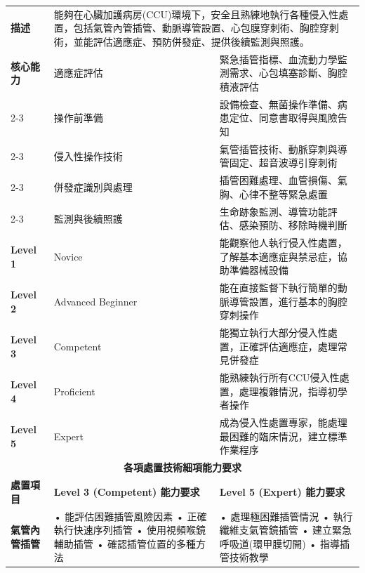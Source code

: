 \documentclass[12pt,a4paper]{article}
\begin{document}
\begin{longtable}{|p{1.5cm}|p{4cm}|p{8.5cm}|}
\rowcolor{emergency_red!10}
\multicolumn{3}{|c|}{\textbf{EPA 11: CCU侵入性處置操作與管理}} \\
\hline
\textbf{描述} & \multicolumn{2}{|p{12.5cm}|}{能夠在心臟加護病房(CCU)環境下，安全且熟練地執行各種侵入性處置，包括氣管內管插管、動脈導管設置、心包膜穿刺術、胸腔穿刺術，並能評估適應症、預防併發症、提供後續監測與照護。} \\
\hline
\textbf{核心能力} & 適應症評估 & 緊急插管指標、血流動力學監測需求、心包填塞診斷、胸腔積液評估 \\
\cline{2-3}
& 操作前準備 & 設備檢查、無菌操作準備、病患定位、同意書取得與風險告知 \\
\cline{2-3}
& 侵入性操作技術 & 氣管插管技術、動脈穿刺與導管固定、超音波導引穿刺術 \\
\cline{2-3}
& 併發症識別與處理 & 插管困難處理、血管損傷、氣胸、心律不整等緊急處置 \\
\cline{2-3}
& 監測與後續照護 & 生命跡象監測、導管功能評估、感染預防、移除時機判斷 \\
\hline
\textbf{Level 1} & Novice & 能觀察他人執行侵入性處置，了解基本適應症與禁忌症，協助準備器械設備 \\
\hline
\textbf{Level 2} & Advanced Beginner & 能在直接監督下執行簡單的動脈導管設置，進行基本的胸腔穿刺操作 \\
\hline
\textbf{Level 3} & Competent & 能獨立執行大部分侵入性處置，正確評估適應症，處理常見併發症 \\
\hline
\textbf{Level 4} & Proficient & 能熟練執行所有CCU侵入性處置，處理複雜情況，指導初學者操作 \\
\hline
\textbf{Level 5} & Expert & 成為侵入性處置專家，能處理最困難的臨床情況，建立標準作業程序 \\
\hline

\multicolumn{3}{|c|}{\textbf{各項處置技術細項能力要求}} \\
\hline
\rowcolor{emergency_blue!10}
\textbf{處置項目} & \textbf{Level 3 (Competent) 能力要求} & \textbf{Level 5 (Expert) 能力要求} \\
\hline

\textbf{氣管內管插管} & • 能評估困難插管風險因素 \newline • 正確執行快速序列插管 \newline • 使用視頻喉鏡輔助插管 \newline • 確認插管位置的多種方法 & • 處理極困難插管情況 \newline • 執行纖維支氣管鏡插管 \newline • 建立緊急呼吸道(環甲膜切開) \newline • 指導插管技術教學 \\
\hline


\end{longtable}
\end{document}

